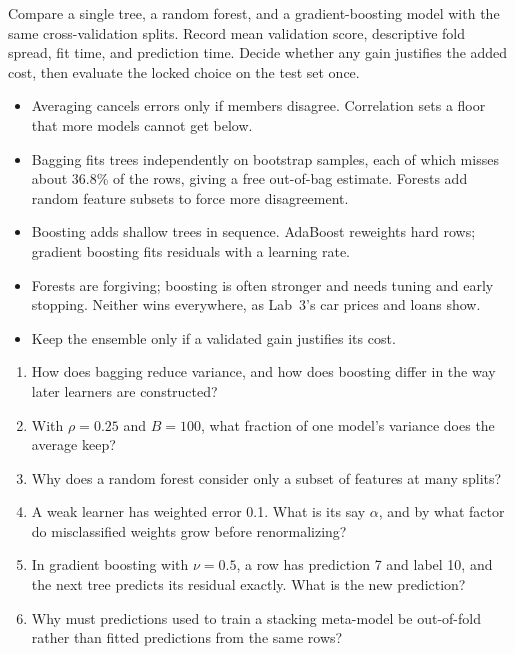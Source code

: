 \begin{tryit}
Compare a single tree, a random forest, and a gradient-boosting model with the same cross-validation splits. Record mean validation score, descriptive fold spread, fit time, and prediction time. Decide whether any gain justifies the added cost, then evaluate the locked choice on the test set once.
\end{tryit}

\begin{chapterrecap}
\begin{itemize}
  \item Averaging cancels errors only if members disagree. Correlation sets a floor that more models cannot get below.
  \item Bagging fits trees independently on bootstrap samples, each of which misses about 36.8\% of the rows, giving a free out-of-bag estimate. Forests add random feature subsets to force more disagreement.
  \item Boosting adds shallow trees in sequence. AdaBoost reweights hard rows; gradient boosting fits residuals with a learning rate.
  \item Forests are forgiving; boosting is often stronger and needs tuning and early stopping. Neither wins everywhere, as Lab~3's car prices and loans show.
  \item Keep the ensemble only if a validated gain justifies its cost.
\end{itemize}
\end{chapterrecap}

\begin{quickcheck}
\begin{enumerate}
  \item How does bagging reduce variance, and how does boosting differ in the way later learners are constructed?
  \item With $\rho=0.25$ and $B=100$, what fraction of one model's variance does the average keep?
  \item Why does a random forest consider only a subset of features at many splits?
  \item A weak learner has weighted error 0.1. What is its say $\alpha$, and by what factor do misclassified weights grow before renormalizing?
  \item In gradient boosting with $\nu=0.5$, a row has prediction 7 and label 10, and the next tree predicts its residual exactly. What is the new prediction?
  \item Why must predictions used to train a stacking meta-model be out-of-fold rather than fitted predictions from the same rows?
\end{enumerate}
\end{quickcheck}
